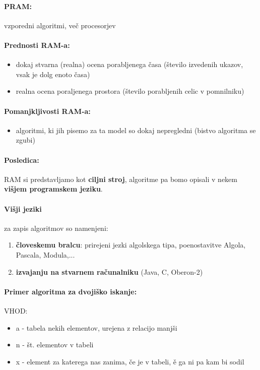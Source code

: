 \documentclass[a4paper,10pt]{article}
\begin{document}
\paragraph{PRAM:} vzporedni algoritmi, ve\v c procesorjev

\paragraph{Prednosti RAM-a:}
\begin{itemize}
\item dokaj stvarna (realna) ocena porabljenega \v casa (\v stevilo izvedenih ukazov, vsak je dolg enoto \v casa)
\item realna ocena poraljenega prostora (\v stevilo porabljenih celic v pomnilniku)
\end{itemize}

\paragraph{Pomanjkljivosti RAM-a:}
\begin{itemize}
\item algoritmi, ki jih pisemo za ta model so dokaj nepregledni (bistvo algoritma se zgubi)
\end{itemize}

\paragraph{Posledica:}
RAM si predstavljamo kot \textbf{ciljni stroj}, algoritme pa bomo opisali v nekem \textbf{vi\v sjem programskem jeziku}.

\paragraph{Vi\v sji jeziki} za zapis algoritmov so namenjeni:
\begin{enumerate}
\item \textbf{\v cloveskemu bralcu}: prirejeni jezki algolskega tipa, poenostavitve Algola, Pascala, Modula,...
\item \textbf{izvajanju na stvarnem ra\v cunalniku} (Java, C, Oberon-2)
\end{enumerate}

\paragraph{Primer algoritma za dvoji\v sko iskanje:}
\begin{flushleft}
VHOD:
\end{flushleft}
\begin{itemize}
\item a - tabela nekih elementov, urejena z relacijo manj\v si
\item n - \v st. elementov v tabeli
\item x - element za katerega nas zanima, \v ce je v tabeli, \v e ga ni pa kam bi sodil
\end{itemize}
\end{document}
